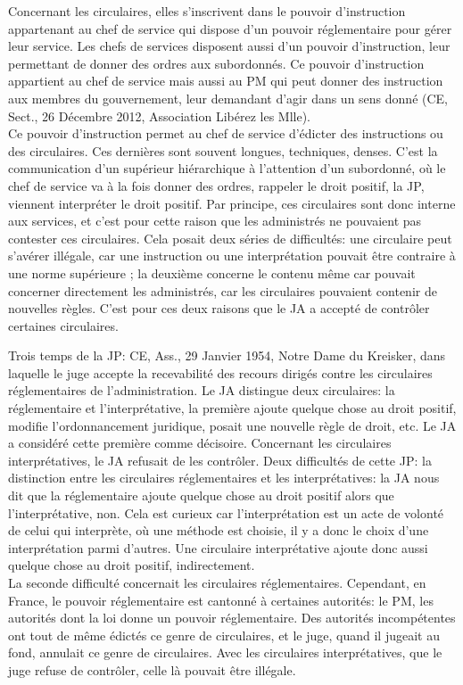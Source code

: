 \documentclass[10pt, a4paper, openany]{book}
\begin{document}
Concernant les circulaires, elles s'inscrivent dans le pouvoir d'instruction appartenant au chef de service qui dispose d'un pouvoir réglementaire pour gérer leur service. Les chefs de services disposent aussi d'un pouvoir d'instruction, leur permettant de donner des ordres aux subordonnés. Ce pouvoir d'instruction appartient au chef de service mais aussi au PM qui peut donner des instruction aux membres du gouvernement, leur demandant d'agir dans un sens donné (CE, Sect., 26 Décembre 2012, Association Libérez les Mlle). \\
Ce pouvoir d'instruction permet au chef de service d'édicter des instructions ou des circulaires. Ces dernières sont souvent longues, techniques, denses. C'est la communication d'un supérieur hiérarchique à l'attention d'un subordonné, où le chef de service va à la fois donner des ordres, rappeler le droit positif, la JP, viennent interpréter le droit positif. Par principe, ces circulaires sont donc interne aux services, et c'est pour cette raison que les administrés ne pouvaient pas contester ces circulaires. Cela posait deux séries de difficultés: une circulaire peut s'avérer illégale, car une instruction ou une interprétation pouvait être contraire à une norme supérieure ; la deuxième concerne le contenu même car pouvait concerner directement les administrés, car les circulaires pouvaient contenir de nouvelles règles. C'est pour ces deux raisons que le JA a accepté de contrôler certaines circulaires.


Trois temps de la JP: CE, Ass., 29 Janvier 1954, Notre Dame du Kreisker, dans laquelle le juge accepte la recevabilité des recours dirigés contre les circulaires réglementaires de l'administration. Le JA distingue deux circulaires: la réglementaire et l'interprétative, la première ajoute quelque chose au droit positif, modifie l'ordonnancement juridique, posait une nouvelle règle de droit, etc. Le JA a considéré cette première comme décisoire. Concernant les circulaires interprétatives, le JA refusait de les contrôler. Deux difficultés de cette JP: la distinction entre les circulaires réglementaires et les interprétatives: la JA nous dit que la réglementaire ajoute quelque chose au droit positif alors que l'interprétative, non. Cela est curieux car l'interprétation est un acte de volonté de celui qui interprète, où une méthode est choisie, il y a donc le choix d'une interprétation parmi d'autres. Une circulaire interprétative ajoute donc aussi quelque chose au droit positif, indirectement. \\
La seconde difficulté concernait les circulaires réglementaires. Cependant, en France, le pouvoir réglementaire est cantonné à certaines autorités: le PM, les autorités dont la loi donne un pouvoir réglementaire. Des autorités incompétentes ont tout de même édictés ce genre de circulaires, et le juge, quand il jugeait au fond, annulait ce genre de circulaires. Avec les circulaires interprétatives, que le juge refuse de contrôler, celle là pouvait être illégale.
\end{document}
